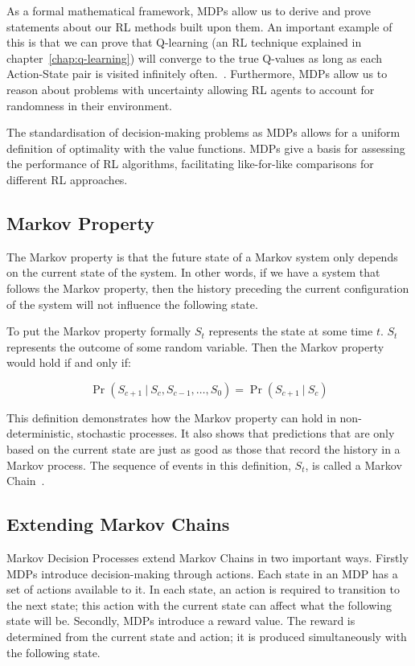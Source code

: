 \documentclass[]{final_report}
\begin{document}
As a formal mathematical framework, MDPs allow us to derive and prove statements about our RL methods built upon them. An important example of this is that we can prove that Q-learning (an RL technique explained in chapter~\ref{chap:q-learning}) will converge to the true Q-values as long as each Action-State pair is visited infinitely often.~\cite{watkins1992q}. Furthermore, MDPs allow us to reason about problems with uncertainty allowing RL agents to account for randomness in their environment. 

The standardisation of decision-making problems as MDPs allows for a uniform definition of optimality with the value functions. MDPs give a basis for assessing the performance of RL algorithms, facilitating like-for-like comparisons for different RL approaches. 


\subsection{Markov Property}

The Markov property is that the future state of a Markov system only depends on the current state of the system. In other words, if we have a system that follows the Markov property, then the history preceding the current configuration of the system will not influence the following state.

To put the Markov property formally $S_t$ represents the state at some time $t$. $S_t$ represents the outcome of some random variable. Then the Markov property would hold if and only if:


\begin{equation}
  \Pr(S_{c+1}\ |\ S_{c},S_{c-1},\dots,S_0) = \Pr(S_{c+1}\ |\ S_{c})
  \label{eqn:markov-property}
\end{equation}

This definition demonstrates how the Markov property can hold in non-deterministic, stochastic processes. It also shows that predictions that are only based on the current state are just as good as those that record the history in a Markov process. The sequence of events in this definition, $S_t$, is called a Markov Chain~\cite{meyn2012markov}.

\subsection{Extending Markov Chains}

Markov Decision Processes extend Markov Chains in two important ways. Firstly MDPs introduce decision-making through actions. Each state in an MDP has a set of actions available to it. In each state, an action is required to transition to the next state; this action with the current state can affect what the following state will be. Secondly, MDPs introduce a reward value. The reward is determined from the current state and action; it is produced simultaneously with the following state.
\end{document}
